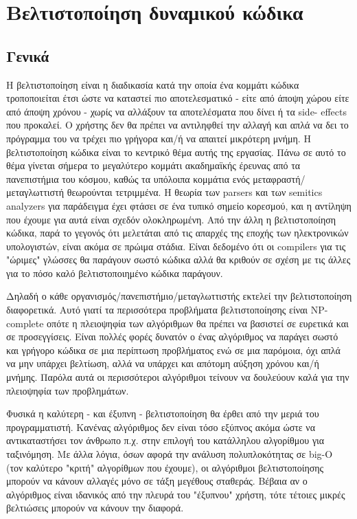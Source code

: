
\chapter{Βελτιστοποίηση δυναμικού κώδικα}
\label{chapter2}

\section{Γενικά}

Η βελτιστοποίηση είναι η διαδικασία κατά την οποία ένα κομμάτι κώδικα
τροποποιείται έτσι ώστε να καταστεί πιο αποτελεσματικό - είτε από άποψη χώρου
είτε από άποψη χρόνου - χωρίς να αλλάξουν τα αποτελέσματα που δίνει ή τα side-
effects που προκαλεί. Ο χρήστης δεν θα πρέπει να αντιληφθεί την αλλαγή και απλά
να δει το πρόγραμμα του να τρέχει πιο γρήγορα και/ή να απαιτεί μικρότερη μνήμη.
Η βελτιστοποίηση κώδικα είναι το κεντρικό θέμα αυτής της εργασίας. Πάνω σε αυτό
το θέμα γίνεται σήμερα το μεγαλύτερο κομμάτι ακαδημαϊκής έρευνας από τα
πανεπιστήμια του κόσμου, καθώς τα υπόλοιπα κομμάτια ενός
μεταφραστή/μεταγλωττιστή θεωρούνται τετριμμένα. Η θεωρία των parsers και των
semitics analyzers για παράδειγμα έχει φτάσει σε ένα τυπικό σημείο κορεσμού, και
η αντίληψη που έχουμε για αυτά είναι σχεδόν ολοκληρωμένη. Από την άλλη η
βελτιστοποίηση κώδικα, παρά το γεγονός ότι μελετάται από τις απαρχές της εποχής
των ηλεκτρονικών υπολογιστών, είναι ακόμα σε πρώιμα στάδια.  Είναι δεδομένο ότι
οι compilers για τις "ώριμες" γλώσσες θα παράγουν σωστό κώδικα αλλά θα κριθούν
σε σχέση με τις άλλες για το πόσο καλό βελτιστοποιημένο κώδικα παράγουν.

Δηλαδή ο κάθε οργανισμός/πανεπιστήμιο/μεταγλωττιστής εκτελεί την βελτιστοποίηση
διαφορετικά. Αυτό γιατί τα περισσότερα προβλήματα βελτιστοποίησης είναι NP-
complete οπότε η πλειοψηφία των αλγόριθμων θα πρέπει να βασιστεί σε ευρετικά και
σε προσεγγίσεις. Είναι πολλές φορές δυνατόν ο ένας αλγόριθμος να παράγει σωστό
και γρήγορο κώδικα σε μια περίπτωση προβλήματος ενώ σε μια παρόμοια, όχι απλά να
μην υπάρχει βελτίωση, αλλά να υπάρχει και απότομη αύξηση χρόνου και/ή μνήμης.
Παρόλα αυτά οι περισσότεροι αλγόριθμοι τείνουν να δουλεύουν καλά για την
πλειοψηφία των προβλημάτων.

Φυσικά η καλύτερη - και έξυπνη - βελτιστοποίηση θα έρθει από την μεριά του
προγραμματιστή. Κανένας αλγόριθμος δεν είναι τόσο εξύπνος ακόμα ώστε να
αντικαταστήσει τον άνθρωπο π.χ. στην επιλογή του κατάλληλου αλγορίθμου για
ταξινόμηση. Με άλλα λόγια, όσων αφορά την ανάλυση πολυπλοκότητας σε big-O (τον
καλύτερο "κριτή" αλγορίθμων που έχουμε), οι αλγόριθμοι βελτιστοποίησης μπορούν
να κάνουν αλλαγές μόνο σε τάξη μεγέθους σταθεράς. Βέβαια αν ο αλγόριθμος είναι
ιδανικός από την πλευρά του "έξυπνου" χρήστη, τότε τέτοιες μικρές βελτιώσεις
μπορούν να κάνουν την διαφορά.

